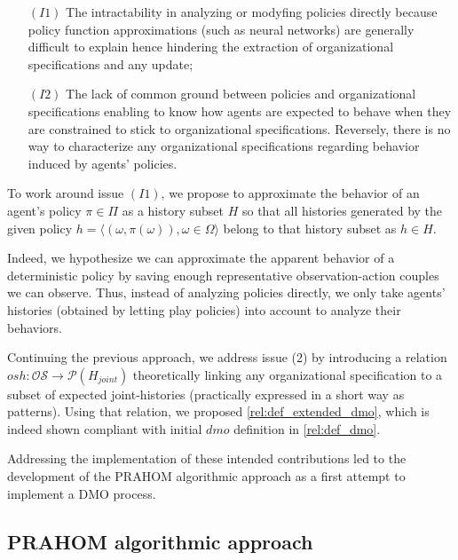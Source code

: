 \documentclass[runningheads]{llncs}
\newcounter{relation}
\newcounter{proof}
\begin{document}
\begin{itemize}[wide, labelsep = 1em]
    \item[$(I1)$] The intractability in analyzing or modyfing policies directly because policy function approximations (such as neural networks) are generally difficult to explain hence hindering the extraction of organizational specifications and any update;
    \item[$(I2)$] The lack of common ground between policies and organizational specifications enabling to know how agents are expected to behave when they are constrained to stick to organizational specifications. Reversely, there is no way to characterize any organizational specifications regarding behavior induced by agents' policies.
\end{itemize}

To work around issue $(I1)$, we propose to approximate the behavior of an agent's policy $\pi \in \Pi$ as a history subset $H$ so that all histories generated by the given policy $h = \langle (\omega,\pi(\omega)), \omega \in \Omega \rangle$ belong to that history subset as $h \in H$.

Indeed, we hypothesize we can approximate the apparent behavior of a deterministic policy by saving enough representative observation-action couples we can observe. Thus, instead of analyzing policies directly, we only take agents' histories (obtained by letting play policies) into account to analyze their behaviors.

Continuing the previous approach, we address issue (2) by introducing a relation $osh: \mathcal{OS} \rightarrow \mathcal{P}(H_{joint})$ theoretically linking any organizational specification to a subset of expected joint-histories (practically expressed in a short way as patterns).
Using that relation, we proposed \autoref{rel:def_extended_dmo}, which is indeed shown compliant with initial $dmo$ definition in \autoref{rel:def_dmo}\footnotemark[1].%


Addressing the implementation of these intended contributions led to the development of the PRAHOM algorithmic approach as a first attempt to implement a DMO process.

\subsection{PRAHOM algorithmic approach}
\end{document}
